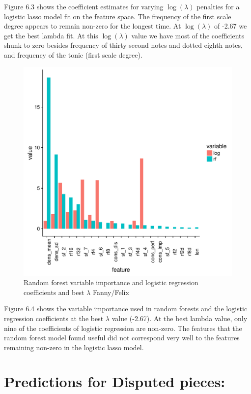 \documentclass[12pt,twoside]{reedthesis}
\theoremstyle{definition}
\theoremstyle{definition}
\theoremstyle{definition}
\theoremstyle{remark}
\begin{document}
Figure 6.3 shows the coefficient estimates for varying \(\log(\lambda)\)
penalties for a logistic lasso model fit on the feature space. The
frequency of the first scale degree appears to remain non-zero for the
longest time. At \(\log(\lambda)\) of -2.67 we get the best lambda fit.
At this \(\log(\lambda)\) value we have most of the coefficients shunk
to zero besides frequency of thirty second notes and dotted eighth
notes, and frequency of the tonic (first scale degree).
\begin{figure}[H]
\centering
\includegraphics[scale = .5]{images/var_imp_rflog_b.pdf}
\caption{Random forest variable importance and logistic regression coefficients and best $\lambda$ Fanny/Felix}
\label{subd}
\end{figure}
Figure 6.4 shows the variable importance used in random forests and the
logistic regression coefficients at the best \(\lambda\) value (-2.67).
At the best lambda value, only nine of the coefficients of logistic
regression are non-zero. The features that the random forest model found
useful did not correspond very well to the features remaining non-zero
in the logistic lasso model.

\section{Predictions for Disputed
pieces:}\label{predictions-for-disputed-pieces}
\end{document}
